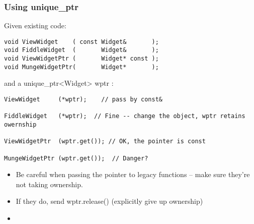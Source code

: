 
\begin{frame}[fragile]
\frametitle{Using unique\_ptr}
Given existing code:
{\scriptsize\begin{verbatim}
void ViewWidget    ( const Widget&       );
void FiddleWidget  (       Widget&       );
void ViewWidgetPtr (       Widget* const );
void MungeWidgetPtr(       Widget*       );
\end{verbatim}
}

and a unique\_ptr<Widget> wptr : 

{\scriptsize\begin{verbatim}
ViewWidget     (*wptr);    // pass by const&

FiddleWidget   (*wptr);  // Fine -- change the object, wptr retains owernship

ViewWidgetPtr  (wptr.get()); // OK, the pointer is const

MungeWidgetPtr (wptr.get());  // Danger?
\end{verbatim}}
\begin{itemize}
\item Be careful when passing the pointer to legacy functions -- make sure
they're not taking ownership.
\item If they do, send wptr.release()  (explicitly give up ownership)
\pause{}
\item {}
\end{itemize}

\end{frame}



